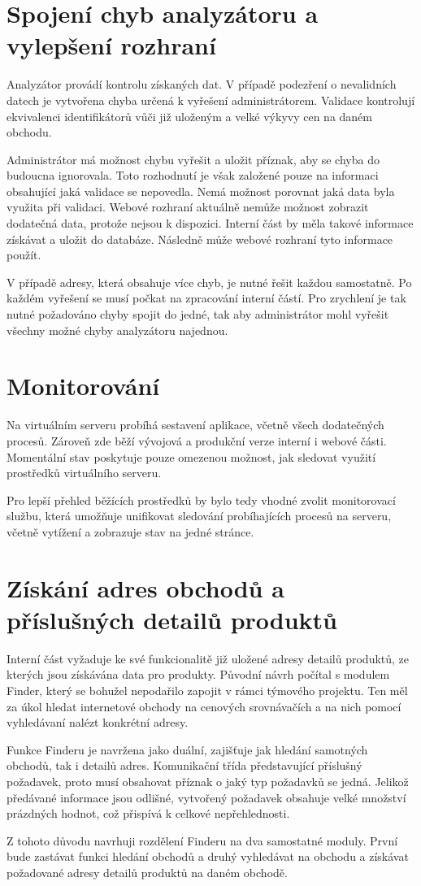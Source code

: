 \documentclass[thesis=B,czech]{FITthesis}[2012/06/26]
\begin{document}
\section{Spojení chyb analyzátoru a vylepšení rozhraní} \label{analyser-join}
Analyzátor provádí kontrolu získaných dat. V případě podezření o nevalidních datech je vytvořena chyba určená k vyřešení
administrátorem. Validace kontrolují ekvivalenci identifikátorů vůči již uloženým a velké výkyvy cen na daném obchodu.
\par
Administrátor má možnost chybu vyřešit a uložit příznak, aby se chyba do budoucna ignorovala. Toto rozhodnutí je však
založené pouze na informaci obsahující jaká validace se nepovedla. Nemá možnost porovnat jaká data byla využita při validaci.
Webové rozhraní aktuálně nemůže možnost zobrazit dodatečná data, protože nejsou k dispozici. Interní část by měla takové informace
získávat a uložit do databáze. Následně může webové rozhraní tyto informace použít.
\par
V případě adresy, která obsahuje více chyb, je nutné řešit každou samostatně. Po každém vyřešení se musí počkat na zpracování interní částí.
Pro zrychlení je tak nutné požadováno chyby spojit do jedné, tak aby administrátor mohl vyřešit všechny možné chyby analyzátoru najednou.
\section{Monitorování}
Na virtuálním serveru probíhá sestavení aplikace, včetně všech dodatečných procesů. Zároveň zde běží vývojová a produkční verze interní i webové části.
Momentální stav poskytuje pouze omezenou možnost, jak sledovat využití prostředků virtuálního serveru.
\par
Pro lepší přehled běžících prostředků by bylo tedy vhodné zvolit monitorovací službu, která umožňuje unifikovat sledování
probíhajících procesů na serveru, včetně vytížení a zobrazuje stav na jedné stránce.

\section{Získání adres obchodů a příslušných detailů produktů}
Interní část vyžaduje ke své funkcionalitě již uložené adresy detailů produktů, ze kterých jsou získávána data pro produkty.
Původní návrh počítal s modulem Finder, který se bohužel nepodařilo zapojit v rámci týmového projektu. Ten 
měl za úkol hledat internetové obchody na cenových srovnávačích a na nich pomocí vyhledávaní nalézt konkrétní adresy.
\par
Funkce Finderu je navržena jako duální, zajišťuje jak hledání samotných obchodů, tak i detailů adres. Komunikační třída představující příslušný požadavek, proto musí obsahovat příznak o jaký typ požadavků se jedná. Jelikož předávané informace
jsou odlišné, vytvořený požadavek obsahuje velké množství prázdných hodnot, což přispívá k celkové nepřehlednosti.
\par
Z tohoto důvodu navrhuji rozdělení Finderu na dva samostatné moduly. První bude zastávat funkci hledání obchodů a druhý
vyhledávat na obchodu a získávat požadované adresy detailů produktů na daném obchodě.
\end{document}
